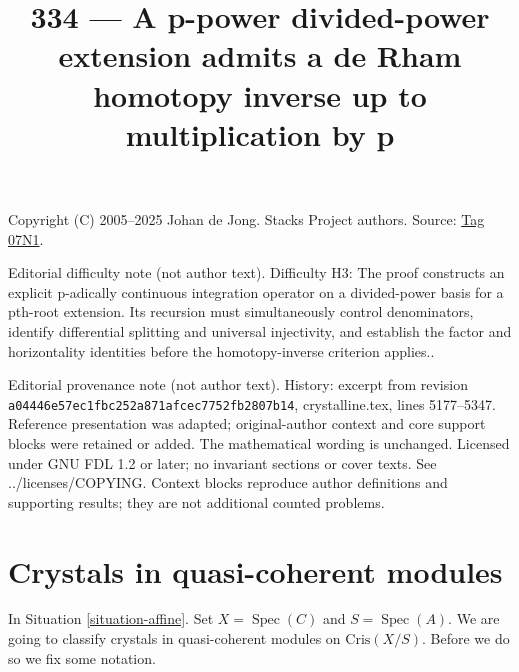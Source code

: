 \documentclass{amsart}
\theoremstyle{plain}
\theoremstyle{definition}
\theoremstyle{remark}
\numberwithin{equation}{subsection}
\def\Spec{\mathop{\mathrm{Spec}}}
\begin{document}
\title[Stacks Project, Tag 07N1]{334 --- A p-power divided-power extension admits a de Rham homotopy inverse up to multiplication by p}
\maketitle
\noindent Copyright (C) 2005--2025 Johan de Jong. Stacks Project authors. Source: \href{https://stacks.math.columbia.edu/tag/07N1}{Tag 07N1}.

\noindent Editorial difficulty note (not author text). Difficulty H3: The proof constructs an explicit p-adically continuous integration operator on a divided-power basis for a pth-root extension. Its recursion must simultaneously control denominators, identify differential splitting and universal injectivity, and establish the factor and horizontality identities before the homotopy-inverse criterion applies..

\noindent Editorial provenance note (not author text). History: excerpt from revision \texttt{a0444\allowbreak 6e57e\allowbreak c1fbc\allowbreak 252a8\allowbreak 71afc\allowbreak ec775\allowbreak 2fb28\allowbreak 07b14}, crystalline.tex, lines 5177--5347. Reference presentation was adapted; original-author context and core support blocks were retained or added. The mathematical wording is unchanged. Licensed under GNU FDL 1.2 or later; no invariant sections or cover texts. See ../licenses/COPYING. Context blocks reproduce author definitions and supporting results; they are not additional counted problems.

\section{Crystals in quasi-coherent modules}
\label{section-quasi-coherent-crystals}

\noindent
In Situation \ref{situation-affine}.
Set $X = \Spec(C)$ and $S = \Spec(A)$. We are going to
classify crystals in quasi-coherent modules on $\text{Cris}(X/S)$.
Before we do so we fix some notation.
\end{document}
